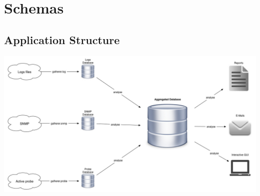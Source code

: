 
\chapter{Schemas} %
\label{AppendixA} %
\section{Application Structure}
\begin{center}
\includegraphics[width=\textwidth]{Pictures/appendices/structure.jpg}
\end{center}

